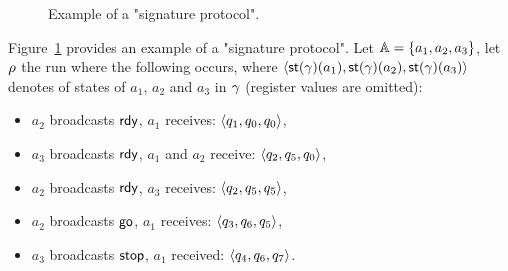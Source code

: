 \begin{figure}[t]
	\centering
	\resizebox*{!}{3cm}{
	
	}
	\caption{Example of a "signature protocol".}\label{fig:ex2}\label{fig:example-signature-protocol}
\end{figure}
\begin{example}
\label{ex:protocol-signature}
	Figure~\ref{fig:example-signature-protocol} provides an example of a "signature protocol".
Let $\mathbb{A} = \{a_1, a_2,a_3\}$, let $\rho$ the run where the following occurs, where $\langle \mathsf{st}(\gamma)(a_1),\mathsf{st}(\gamma)(a_2),\allowbreak \mathsf{st}(\gamma)(a_3) \rangle$ denotes of states of $a_1$, $a_2$ and $a_3$ in $\gamma$ (register values are omitted):
\begin{itemize}
\item $a_2$ broadcasts $\textsf{rdy}$, $a_1$ receives: $\langle q_1, q_0,q_0 \rangle$,
\item $a_3$ broadcasts $\textsf{rdy}$, $a_1$ and $a_2$ receive: $\langle q_2, q_5,q_0 \rangle$,
\item $a_2$ broadcasts $\textsf{rdy}$, $a_3$ receives: $\langle q_2,q_5,q_5 \rangle$,
\item $a_2$ broadcasts $\textsf{go}$, $a_1$ receives:  $\langle q_3,q_6,q_5 \rangle$,
\item $a_3$ broadcasts $\textsf{stop}$, $a_1$ received: $\langle q_4,q_6,q_7 \rangle$.
\end{itemize}
	

\end{example}
